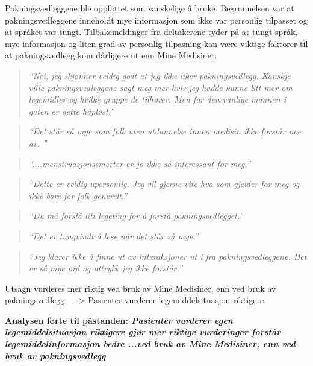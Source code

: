 Pakningsvedleggene ble oppfattet som vanskelige å bruke. Begrunnelsen var at pakningsvedleggene inneholdt mye informasjon som ikke var personlig tilpasset og at språket var tungt. Tilbakemeldinger fra deltakerene tyder på at tungt språk, mye informasjon og liten grad av personlig tilpasning kan være viktige faktorer til at pakningsvedlegg kom dårligere ut enn Mine Medisiner:


\begin{quote} \textit{ ``Nei, jeg skjønner veldig godt at jeg ikke liker pakningsvedlegg. Kanskje ville pakningsvedleggene sagt meg mer hvis jeg hadde kunne litt mer om legemidler og hvilke gruppe de tilhører. Men for den vanlige mannen i gaten er dette håpløst.'' } \end{quote}

\begin{quote} \textit{ ``Det står så mye som folk uten utdannelse innen medisin ikke forstår noe av. '' } \end{quote}

\begin{quote} \textit{ ``....menstruasjonssmerter er jo ikke så interessant for meg.'' } \end{quote}

\begin{quote} \textit{ ``Dette er veldig upersonlig. Jeg vil gjerne vite hva som gjelder for meg og ikke bare for folk generelt.'' } \end{quote}

\begin{quote} \textit{ ``Du må forstå litt legeting for å forstå pakningsvedlegget.'' } \end{quote}

\begin{quote} \textit{ ``Det er tungvindt å lese når det står så mye.'' } \end{quote}

\begin{quote} \textit{ ``Jeg klarer ikke å finne ut av interaksjoner ut i fra pakningsvedleggene. Det er så mye ord og uttrykk jeg ikke forstår.'' } \end{quote}


Utsagn vurderes mer riktig ved bruk av Mine Medisiner, enn ved bruk av pakningsvedlegg
----> Pasienter vurderer legemiddelsituasjon riktigere 

\textbf{Analysen førte til påstanden: \textit{Pasienter 
vurderer egen legemiddelsituasjon riktigere
gjør mer riktige vurderinger
forstår legemiddelinformasjon bedre
...ved bruk av Mine Medisiner, enn ved bruk av pakningsvedlegg}}


